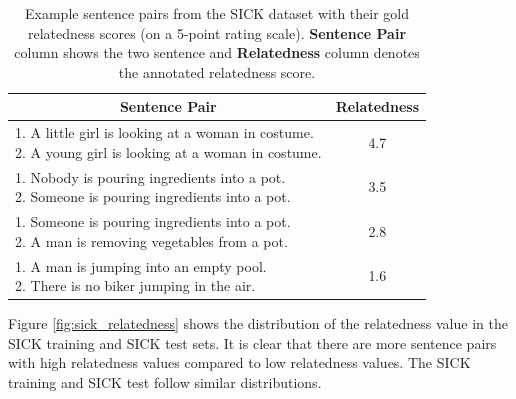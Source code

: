\begin{enumerate}
  \begin{table}[ht!]
  	\centering 	
  	\begin{tabular}{l|c} 
  		\hline
  		\multicolumn{1}{c|}{\textbf{Sentence Pair}} & 
  		\multicolumn{1}{c}{\textbf{Relatedness}}  \\
  		\hline
  		\makecell[l]
  		{1. A little girl is looking at a woman in costume. \\ 
  		 2. A young girl is looking at a woman in costume.} & 4.7  \\
  		\hline
  			\makecell[l]
  		{1. Nobody is pouring ingredients into a pot. \\ 
  			2. Someone is pouring ingredients into a pot. } & 3.5  \\
  		\hline
  		\makecell[l]
  		{1. Someone is pouring ingredients into a pot. \\ 
  		 2. A man is removing vegetables from a pot. } & 2.8  \\
  		\hline
  		\makecell[l]
  		{1. A man is jumping into an empty pool. \\ 
  		 2. There is no biker jumping in the air. } & 1.6  \\
  		\hline               
  	\end{tabular}
  	\caption[Example sentence pairs from the SICK dataset]{Example sentence pairs from the SICK dataset with their gold relatedness scores (on a 5-point rating scale). \textbf{Sentence Pair} column shows the two sentence and \textbf{Relatedness} column denotes the annotated relatedness score.}
  	\label{tab:sickdata}
  \end{table}

Figure \ref{fig:sick_relatedness} shows the distribution of the relatedness value in the SICK training and SICK test sets. It is clear that there are more sentence pairs with high relatedness values compared to low relatedness values. The SICK training and SICK test follow similar distributions. 



\end{enumerate}
